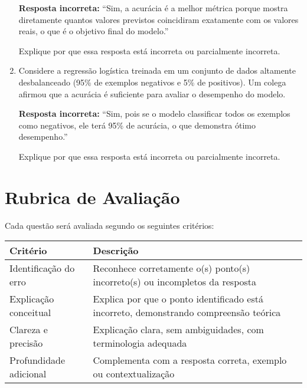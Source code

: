 \documentclass[12pt]{article}
\begin{document}
\begin{enumerate}
    \textbf{Resposta incorreta:}  
    “Sim, a acurácia é a melhor métrica porque mostra diretamente quantos valores previstos coincidiram exatamente com os valores reais, o que é o objetivo final do modelo.”  

    Explique por que essa resposta está incorreta ou parcialmente incorreta.  

    \item Considere a regressão logística treinada em um conjunto de dados altamente desbalanceado (95\% de exemplos negativos e 5\% de positivos).  
    Um colega afirmou que a acurácia é suficiente para avaliar o desempenho do modelo.  

    \textbf{Resposta incorreta:}  
    “Sim, pois se o modelo classificar todos os exemplos como negativos, ele terá 95\% de acurácia, o que demonstra ótimo desempenho.”  

    Explique por que essa resposta está incorreta ou parcialmente incorreta.  



\end{enumerate}

\vspace{1cm}
\section*{Rubrica de Avaliação}
Cada questão será avaliada segundo os seguintes critérios:

\begin{center}
\begin{tabular}{p{4.5cm}p{10cm}}
\toprule
\textbf{Critério} & \textbf{Descrição}  \\
\midrule
Identificação do erro & Reconhece corretamente o(s) ponto(s) incorreto(s) ou incompletos da resposta \\
Explicação conceitual & Explica por que o ponto identificado está incorreto, demonstrando compreensão teórica \\
Clareza e precisão & Explicação clara, sem ambiguidades, com terminologia adequada \\
Profundidade adicional & Complementa com a resposta correta, exemplo ou contextualização \\
\midrule
\bottomrule
\end{tabular}
\end{center}
\end{document}
